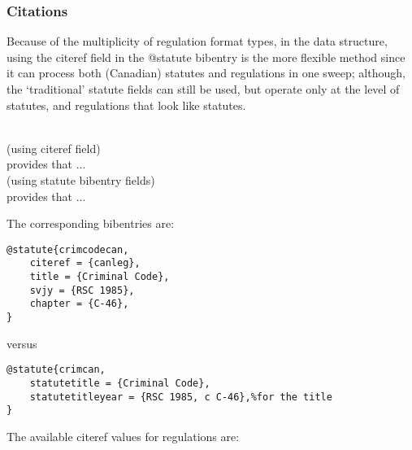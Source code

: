 \subsubsection{Citations}



\par\bigskip
{}\par\bigskip
{}\par\bigskip
{}\par\bigskip

Because of the multiplicity of regulation format types, in the data structure, using the citeref field in the @statute bibentry is the more flexible method since it can process both (Canadian) statutes and regulations in one sweep; although, the `traditional' statute fields can still be used, but operate only at the level of statutes, and regulations that look like statutes.

\ \\
(using citeref field)\\
  provides that ...\\
(using statute bibentry fields) \\
 provides that ...
\par\bigskip

The corresponding bibentries are:

\begin{verbatim}
@statute{crimcodecan,
	citeref = {canleg},
	title = {Criminal Code},
	svjy = {RSC 1985},
	chapter = {C-46},
}

\end{verbatim}

versus

\begin{verbatim}
@statute{crimcan,
	statutetitle = {Criminal Code},
	statutetitleyear = {RSC 1985, c C-46},%for the title
}
\end{verbatim}


The available citeref values for regulations are:

\bigskip

